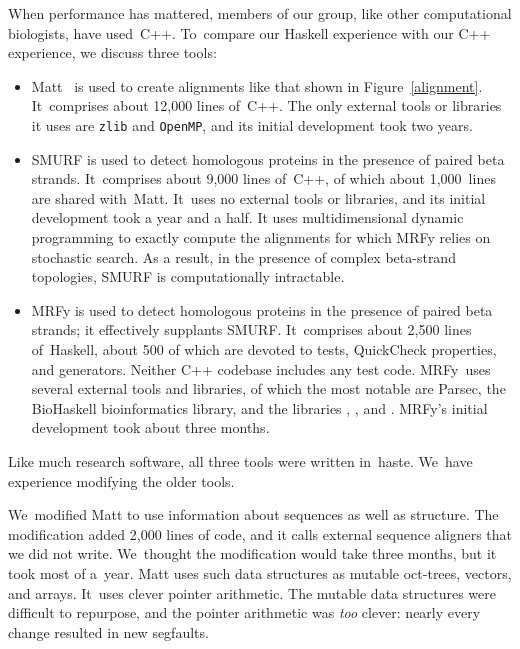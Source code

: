 \documentclass[preprint,nonatbib,blockstyle,times]{sigplanconf}
\newcommand\mrfy{MRFy} %
\newcommand\figref[1]{Figure~\ref{#1}}
\let\cite\citep
\begin{document}
When performance has mattered, members of our group, like other
computational biologists, have used~C++.
To~compare our Haskell experience with our C++ experience,
we discuss three tools:
\begin{itemize}
\item
Matt~\cite{Menke:2008wu} is used to create alignments like that shown
in \figref{alignment}.
It~comprises about 12,000 lines of~C++.
The only external tools or libraries it uses are \texttt{zlib}
and \texttt{OpenMP}, and its initial development took two years.
\item
SMURF
\cite{Menke:2010ti} is used to detect homologous proteins in the presence
of paired beta strands.
It~comprises about 9,000 lines of~C++, of which about 1,000~lines are
shared with~Matt.
It~uses no external tools or libraries, and
its initial development took a year and a half.
It uses multidimensional dynamic programming to exactly compute the alignments
for which MRFy relies on stochastic search.
As a result, in the presence of complex beta-strand topologies, SMURF is
computationally intractable.
\item
MRFy is used to detect homologous proteins in the presence of paired
beta strands; it effectively supplants SMURF.
It~comprises about 2,500 lines of~Haskell, about 500 of which are devoted
to tests, QuickCheck properties, and generators.
Neither C++ codebase includes any test code.
MRFy~uses several external tools and libraries, of which the most
notable are Parsec, the BioHaskell bioinformatics library, and
the libraries , ,
and .
\mrfy's initial development took about three months.
\end{itemize}
Like much research software, all three tools were written
 in~haste.
We~have experience modifying the older tools.



We~modified Matt to use information about sequences as well as structure.
The modification added 2,000 lines of code, and it calls
external sequence aligners that we did not write.
We~thought the modification would take three months, 
but it took most of a~year.
Matt uses such
data structures as mutable oct-trees, vectors, and arrays.
It~uses clever pointer arithmetic.
The mutable data structures were difficult to 
repurpose, and the pointer arithmetic was \emph{too} clever: 
nearly every change resulted in new segfaults.
\end{document}
